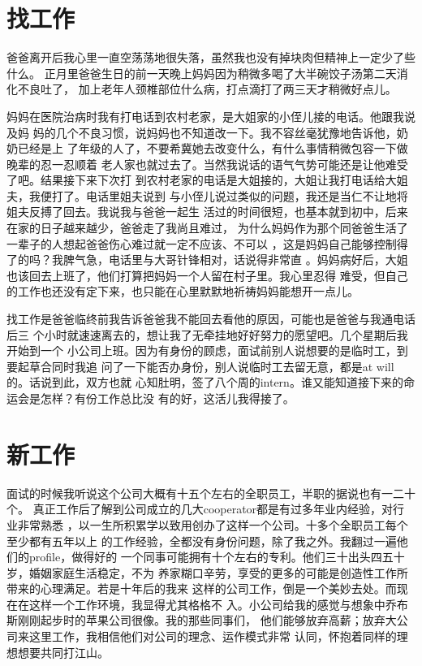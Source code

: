 \documentclass[12pt]{book}
\begin{document}
\section{找工作}
\label{sec-9-44}

爸爸离开后我心里一直空荡荡地很失落，虽然我也没有掉块肉但精神上一定少了些什么。
正月里爸爸生日的前一天晚上妈妈因为稍微多喝了大半碗饺子汤第二天消化不良吐了，
加上老年人颈椎部位什么病，打点滴打了两三天才稍微好点儿。

妈妈在医院治病时我有打电话到农村老家，是大姐家的小侄儿接的电话。他跟我说及妈
妈的几个不良习惯，说妈妈也不知道改一下。我不容丝毫犹豫地告诉他，奶奶已经是上
了年级的人了，不要希冀她去改变什么，有什么事情稍微包容一下做晚辈的忍一忍顺着
老人家也就过去了。当然我说话的语气气势可能还是让他难受了吧。结果接下来下次打
到农村老家的电话是大姐接的，大姐让我打电话给大姐夫，我便打了。电话里姐夫说到
与小侄儿说过类似的问题，我还是当仁不让地将姐夫反搏了回去。我说我与爸爸一起生
活过的时间很短，也基本就到初中，后来在家的日子越来越少，爸爸走了我尚且难过，
为什么妈妈作为那个同爸爸生活了一辈子的人想起爸爸伤心难过就一定不应该、不可以
，这是妈妈自己能够控制得了的吗？我脾气急，电话里与大哥针锋相对，话说得非常直
。妈妈病好后，大姐也该回去上班了，他们打算把妈妈一个人留在村子里。我心里忍得
难受，但自己的工作也还没有定下来，也只能在心里默默地祈祷妈妈能想开一点儿。

找工作是爸爸临终前我告诉爸爸我不能回去看他的原因，可能也是爸爸与我通电话后三
个小时就速速离去的，想让我了无牵挂地好好努力的愿望吧。几个星期后我开始到一个
小公司上班。因为有身份的顾虑，面试前别人说想要的是临时工，到要起草合同时我追
问了一下能否办身份，别人说临时工去留无意，都是at will的。话说到此，双方也就
心知肚明，签了八个周的intern。谁又能知道接下来的命运会是怎样？有份工作总比没
有的好，这活儿我得接了。
\section{新工作}
\label{sec-9-45}

面试的时候我听说这个公司大概有十五个左右的全职员工，半职的据说也有一二十个。
真正工作后了解到公司成立的几大cooperator都是有过多年业内经验，对行业非常熟悉
，以一生所积累学以致用创办了这样一个公司。十多个全职员工每个至少都有五年以上
的工作经验，全都没有身份问题，除了我之外。我翻过一遍他们的profile，做得好的
一个同事可能拥有十个左右的专利。他们三十出头四五十岁，婚姻家庭生活稳定，不为
养家糊口辛劳，享受的更多的可能是创造性工作所带来的心理满足。若是十年后的我来
这样的公司工作，倒是一个美妙去处。而现在在这样一个工作环境，我显得尤其格格不
入。小公司给我的感觉与想象中乔布斯刚刚起步时的苹果公司很像。我的那些同事们，
他们能够放弃高薪；放弃大公司来这里工作，我相信他们对公司的理念、运作模式非常
认同，怀抱着同样的理想想要共同打江山。
\end{document}
